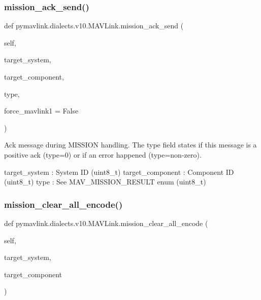 \begin{DoxyVerb}
\begin{DoxyVerb}
\begin{DoxyVerb}
\begin{DoxyVerb}
\subsubsection{\texorpdfstring{mission\+\_\+ack\+\_\+send()}{mission\_ack\_send()}}
{\footnotesize\ttfamily def pymavlink.\+dialects.\+v10.\+M\+A\+V\+Link.\+mission\+\_\+ack\+\_\+send (\begin{DoxyParamCaption}\item[{}]{self,  }\item[{}]{target\+\_\+system,  }\item[{}]{target\+\_\+component,  }\item[{}]{type,  }\item[{}]{force\+\_\+mavlink1 = {\ttfamily False} }\end{DoxyParamCaption})}

\begin{DoxyVerb}Ack message during MISSION handling. The type field states if this
message is a positive ack (type=0) or if an error
happened (type=non-zero).

target_system             : System ID (uint8_t)
target_component          : Component ID (uint8_t)
type                      : See MAV_MISSION_RESULT enum (uint8_t)\end{DoxyVerb}
 \mbox{\label{classpymavlink_1_1dialects_1_1v10_1_1MAVLink_a3230a1acefe608aeee0b8d4495e2bd00}} 
\subsubsection{\texorpdfstring{mission\+\_\+clear\+\_\+all\+\_\+encode()}{mission\_clear\_all\_encode()}}
{\footnotesize\ttfamily def pymavlink.\+dialects.\+v10.\+M\+A\+V\+Link.\+mission\+\_\+clear\+\_\+all\+\_\+encode (\begin{DoxyParamCaption}\item[{}]{self,  }\item[{}]{target\+\_\+system,  }\item[{}]{target\+\_\+component }\end{DoxyParamCaption})}


\end{DoxyVerb}
\end{DoxyVerb}
\end{DoxyVerb}
\end{DoxyVerb}
